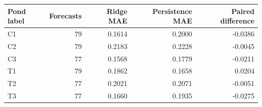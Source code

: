 \begin{tabular}{lrrrr}
\toprule
Pond label & Forecasts & Ridge MAE & Persistence MAE & Paired difference \\
\midrule
C1 & 79 & 0.1614 & 0.2000 & -0.0386 \\
C2 & 79 & 0.2183 & 0.2228 & -0.0045 \\
C3 & 77 & 0.1568 & 0.1779 & -0.0211 \\
T1 & 79 & 0.1862 & 0.1658 & 0.0204 \\
T2 & 77 & 0.2021 & 0.2071 & -0.0051 \\
T3 & 77 & 0.1660 & 0.1935 & -0.0275 \\
\bottomrule
\end{tabular}